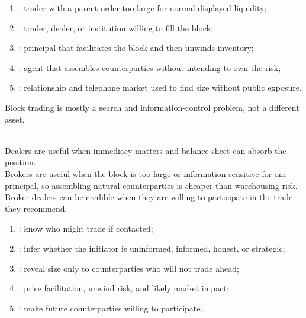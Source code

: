\documentclass[a4paper,oneside,openany]{book}
\begin{document}
\begin{taxonomy} 
\begin{enumerate}[label=\roman*.]
\setlength{\itemsep}{0pt}
\item {}: trader with a parent order too large for normal displayed liquidity;
\item {}: trader, dealer, or institution willing to fill the block;
\item {}: principal that facilitates the block and then unwinds inventory;
\item {}: agent that assembles counterparties without intending to own the risk;
\item {}: relationship and telephone market used to find size without public exposure.
\end{enumerate}
Block trading is mostly a search and information-control problem, not a different asset.
\end{taxonomy}

\begin{principle} \\
Dealers are useful when immediacy matters and balance sheet can absorb the position.\\
Brokers are useful when the block is too large or information-sensitive for one principal, so assembling natural counterparties is cheaper than warehousing risk.\\
Broker-dealers can be credible when they are willing to participate in the trade they recommend.
\end{principle}

\begin{taxonomy} 
\begin{enumerate}[label=\roman*.]
\setlength{\itemsep}{0pt}
\item {}: know who might trade if contacted;
\item {}: infer whether the initiator is uninformed, informed, honest, or strategic;
\item {}: reveal size only to counterparties who will not trade ahead;
\item {}: price facilitation, unwind risk, and likely market impact;
\item {}: make future counterparties willing to participate.
\end{enumerate}
\end{taxonomy}
\end{document}
